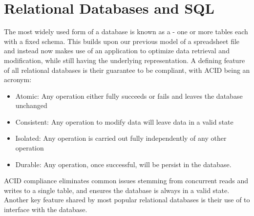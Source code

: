\section{Relational Databases and SQL}

The most widely used form of a database is known as a  - one or more tables each with a fixed schema. This builds upon our previous model of a spreadsheet file and instead now makes use of an application to optimize data retrieval and modification, while still having the underlying representation. A defining feature of all relational databases is their guarantee to be  compliant, with ACID being an acronym:

\begin{itemize}
    \item Atomic: Any operation either fully succeeds or fails and leaves the database unchanged
    \item Consistent: Any operation to modify data will leave data in a valid state
    \item Isolated: Any operation is carried out fully independently of any other operation
    \item Durable: Any operation, once successful, will be persist in the database.
\end{itemize}

ACID compliance eliminates common issues stemming from concurrent reads and writes to a single table, and ensures the database is always in a valid state. Another key feature shared by most popular relational databases is their use of  to interface with the database.

